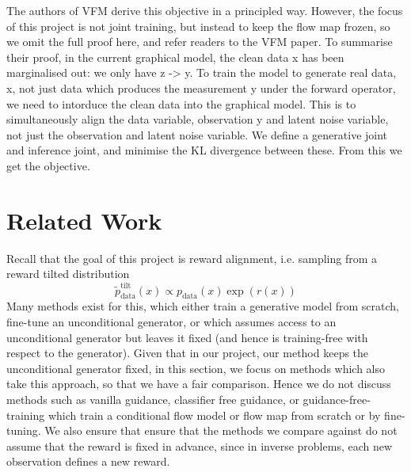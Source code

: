 \documentclass[12pt,a4paper]{report}
\begin{document}
The authors of VFM derive this objective in a principled way. However, the focus of this project is not joint training, but instead to keep the flow map frozen, so we omit the full proof here, and refer readers to the VFM paper. 
To summarise their proof, in the current graphical model, the clean data x has been marginalised out: we only have z -> y. 
To train the model to generate real data, x, not just data which produces the measurement y under the forward operator, we need to intorduce the clean data into the graphical model. 
This is to simultaneously align the data variable, observation y and latent noise variable, not just the observation and latent noise variable. 
We define a generative joint and inference joint, and minimise the KL divergence between these. 
From this we get the objective. 


\chapter{Related Work}
Recall that the goal of this project is reward alignment, i.e. sampling from a reward tilted distribution
\begin{equation}
    \widetilde{p}_{\text{data}}^{\text{tilt}}(x) \propto p_{\text{data}}(x) \exp (r(x))
\end{equation}
Many methods exist for this, which either train a generative model from scratch, fine-tune an unconditional generator, or which assumes access to an unconditional generator but leaves it fixed (and hence is training-free with respect to the generator). Given that in our project, our method keeps the unconditional generator fixed, in this section, we focus on methods which also take this approach, so that we have a fair comparison. 
Hence we do not discuss methods such as vanilla guidance, classifier free guidance, or guidance-free-training which train a conditional flow model or flow map from scratch or by fine-tuning. 
We also ensure that ensure that the methods we compare against do not assume that the reward is fixed in advance, since in inverse problems, each new observation defines a new reward. 
\end{document}

